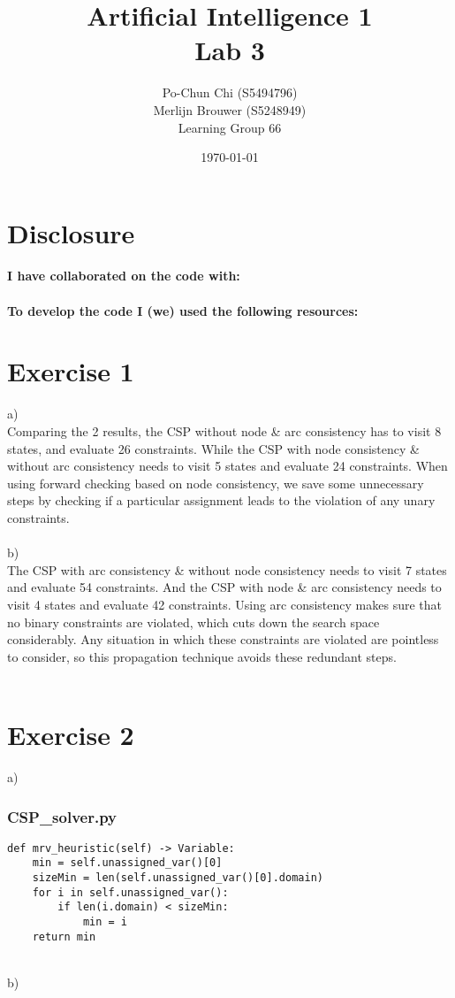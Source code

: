 \documentclass{article}
\title{{\bf Artificial Intelligence 1} \\ Lab 3}%
\author{
Po-Chun Chi (S5494796)
\\
Merlijn Brouwer (S5248949)
\\
Learning Group 66
} %
\date{\today}
\begin{document}
\maketitle

\section*{Disclosure}

\paragraph{I have collaborated on the code with:} 
\paragraph{To develop the code I (we) used the following resources:\\ 
} %




\section*{Exercise 1}
a)
\\
Comparing the 2 results, the CSP without node \& arc consistency has to visit 8 states, and evaluate 26 constraints. While the CSP with node consistency \& without arc consistency needs to visit 5 states and evaluate 24 constraints. When using forward checking based on node consistency, we save some unnecessary steps by checking if a particular assignment leads to the violation of any unary constraints.\\
\\
b)
\\
The CSP with arc consistency \& without node consistency needs to visit 7 states and evaluate 54 constraints. And the CSP with node \& arc consistency needs to visit 4 states and evaluate 42 constraints. Using arc consistency makes sure that no binary constraints are violated, which cuts down the search space considerably. Any situation in which these constraints are violated are pointless to consider, so this propagation technique avoids these redundant steps.\\
\\
\section*{Exercise 2}
a) 
\subsubsection*{CSP\_solver.py}
\begin{lstlisting} 
def mrv_heuristic(self) -> Variable:
    min = self.unassigned_var()[0]
    sizeMin = len(self.unassigned_var()[0].domain)
    for i in self.unassigned_var():
        if len(i.domain) < sizeMin:
            min = i   
    return min
\end{lstlisting}
\\
b) 
\end{document}
